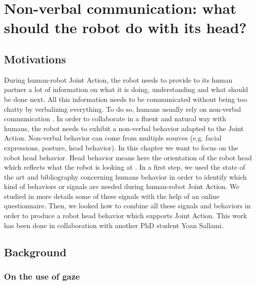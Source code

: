 \documentclass[english,a4paper,11pt,twoside]{StyleThese}
\begin{document}
\setcounter{chapter}{5} %
\dominitoc
\faketableofcontents
\fi

\chapter{Non-verbal communication: what should the robot do with its head?}
\minitoc

\label{ch:Acting}

\section{Motivations}

During human-robot Joint Action, the robot needs to provide to its human partner a lot of information on what it is doing, 
understanding and what should be done next. All this information needs to be communicated without being too chatty by verbalizing everything. To do so, humans usually rely on non-verbal communication \cite{ekman1969repertoire, depaulo1992nonverbal}. In order to collaborate in a fluent and natural way with humans, the robot needs to exhibit a non-verbal behavior adapted to the Joint Action. Non-verbal behavior can come from multiple sources (e.g. facial expressions, posture, head behavior). In this chapter we want to focus on the robot head behavior. Head behavior means here the orientation of the robot head which reflects what the robot is looking at \cite{imai2002robot}. In a first step, we used the state of the art and bibliography concerning humans behavior in order to identify which kind of behaviors or signals are needed during human-robot Joint Action. We studied in more details some of these signals with the help of an online questionnaire. Then, we looked how to combine all these signals and behaviors in order to produce a robot head behavior which supports Joint Action. This work has been done in collaboration with another PhD student Yoan Sallami.


\section{Background}

\subsection{On the use of gaze}
\end{document}
